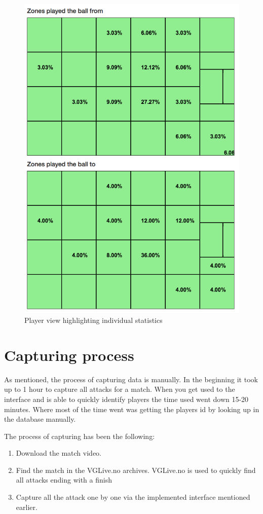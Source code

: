 \begin{figure}[ht!]
\centering
\includegraphics[width=1\textwidth]{images/general/player_view2.png}
\caption{Player view highlighting individual statistics}
\label{fig:player_view2}
\end{figure}


\section{Capturing process}
\label{sec:capprocess}

As mentioned, the process of capturing data is manually. In the beginning it took up to 1 hour to capture all attacks for a match. When you get used to the interface and is able to quickly identify players the time used went down 15-20 minutes. Where most of the time went was getting the players id by looking up in the database manually. 

The process of capturing has been the following:
\begin{enumerate}
\item Download the match video.
\item Find the match in the VGLive.no archives. VGLive.no is used to quickly find all attacks ending with a finish
\item Capture all the attack one by one via the implemented interface mentioned earlier.
\end{enumerate}

